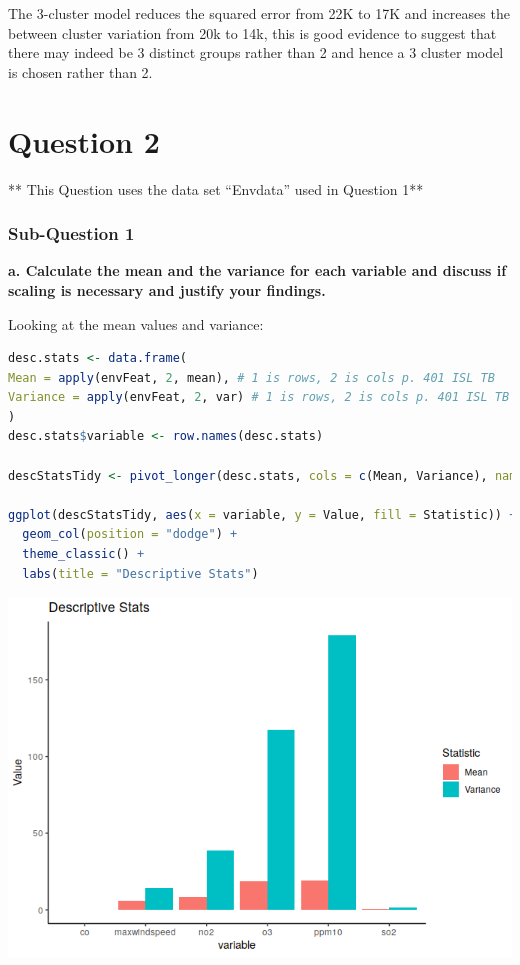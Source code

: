 \documentclass[
]{article}
\begin{document}
The 3-cluster model reduces the squared error from 22K to 17K and
increases the between cluster variation from 20k to 14k, this is good
evidence to suggest that there may indeed be 3 distinct groups rather
than 2 and hence a 3 cluster model is chosen rather than 2.

\hypertarget{question-2}{%
\section{Question 2}\label{question-2}}

** This Question uses the data set ``Envdata'' used in Question 1**

\hypertarget{sub-question-1}{%
\subsubsection{Sub-Question 1}\label{sub-question-1}}

\textbf{a. Calculate the mean and the variance for each variable and
discuss if scaling is necessary and justify your findings.}

Looking at the mean values and variance:

\begin{lstlisting}[language=R]
desc.stats <- data.frame(
Mean = apply(envFeat, 2, mean), # 1 is rows, 2 is cols p. 401 ISL TB
Variance = apply(envFeat, 2, var) # 1 is rows, 2 is cols p. 401 ISL TB
)
desc.stats$variable <- row.names(desc.stats)

descStatsTidy <- pivot_longer(desc.stats, cols = c(Mean, Variance), names_to = "Statistic", values_to = "Value")

ggplot(descStatsTidy, aes(x = variable, y = Value, fill = Statistic)) +
  geom_col(position = "dodge") +
  theme_classic() +
  labs(title = "Descriptive Stats")
\end{lstlisting}

\includegraphics{FinalExam_files/figure-html/unnamed-chunk-11-1.png}
\end{document}
